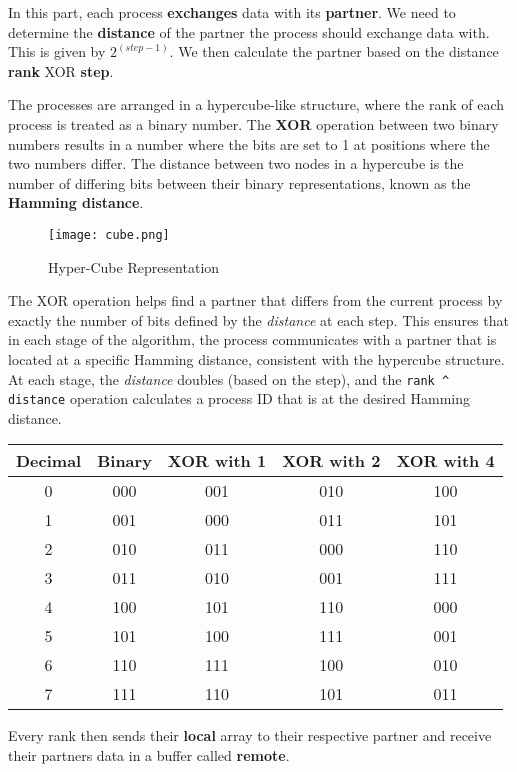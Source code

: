 \documentclass[12pt]{report}
\begin{document}
In this part, each process \textbf{exchanges} data with its \textbf{partner}. We need to determine the \textbf{distance} of the partner the process should exchange data with. This is given by $2^{(step-1)}$.  We then calculate the partner based on the distance \textbf{rank} XOR \textbf{step}.

The processes are arranged in a hypercube-like structure, where the rank of each process is treated as a binary number. The \textbf{XOR} operation between two binary numbers results in a number where the bits are set to 1 at positions where the two numbers differ. The distance between two nodes in a hypercube is the number of differing bits between their binary representations, known as the \textbf{Hamming distance}. 
\begin{figure}[H]
    \centering
    \texttt{[image: cube.png]}
    \caption{Hyper-Cube Representation}
    \label{fig:enter-label}
\end{figure}
The XOR operation helps find a partner that differs from the current process by exactly the number of bits defined by the \textit{distance} at each step. This ensures that in each stage of the algorithm, the process communicates with a partner that is located at a specific Hamming distance, consistent with the hypercube structure. At each stage, the \textit{distance} doubles (based on the step), and the \verb|rank ^ distance| operation calculates a process ID that is at the desired Hamming distance.

\vspace{1cm}
\begin{tabular}{|c|c|c|c|c|}
\hline
\textbf{Decimal} & \textbf{Binary} & \textbf{XOR with 1} & \textbf{XOR with 2} & \textbf{XOR with 4} \\ \hline
0 & 000 & 001 & 010 & 100 \\ \hline
1 & 001 & 000 & 011 & 101 \\ \hline
2 & 010 & 011 & 000 & 110 \\ \hline
3 & 011 & 010 & 001 & 111 \\ \hline
4 & 100 & 101 & 110 & 000 \\ \hline
5 & 101 & 100 & 111 & 001 \\ \hline
6 & 110 & 111 & 100 & 010 \\ \hline
7 & 111 & 110 & 101 & 011 \\ \hline
\end{tabular}
\vspace{1cm}
        
Every rank then sends their \textbf{local} array to their respective partner and receive their partners data in a buffer called \textbf{remote}.
\end{document}
